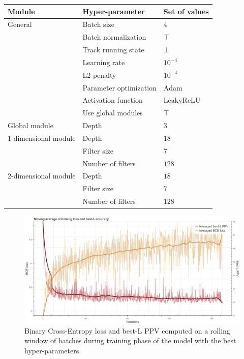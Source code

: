     \begin{table}[H]
        \centering
        \begin{tabular}{lll}
          \hline
          Module & Hyper-parameter & Set of values \\
          \hline
          \hline
          General & Batch size & $4$ \\
                  & Batch normalization & $\top$ \\
                  & Track running state & $\bot$ \\
                  & Learning rate & $10^{-4}$ \\
                  & L2 penalty & $10^{-4}$ \\
                  & Parameter optimization & $\text{Adam}$ \\
                  & Activation function & $\text{LeakyReLU}$ \\
                  & Use global modules & $\top$ \\
          \hline
          Global module & Depth & $3$ \\
          \hline
          1-dimensional module & Depth & $18$ \\
                               & Filter size & $7$ \\
                               & Number of filters & $128$ \\
          \hline
          2-dimensional module & Depth & $18$ \\
                               & Filter size & $7$ \\
                               & Number of filters & $128$ \\
          \hline
        \end{tabular}
        \label{besthp}
    \end{table}

    \begin{figure}[H]
        \begin{center}
            \includegraphics[width=\textwidth, keepaspectratio]{imgs/loss.png}
            \caption{Binary Cross-Entropy loss and best-L PPV computed on
              a rolling window of batches during training phase of the model
              with the best hyper-parameters.}
            \label{lossandppv}
        \end{center}
    \end{figure}

